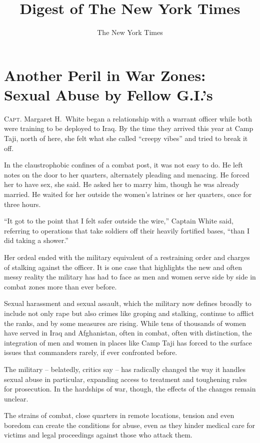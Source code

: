 ﻿\documentclass[12pt]{article}
\title{Digest of The New York Times}
\author{The New York Times}
\begin{document}
\date{}
\thispagestyle{empty}
\renewcommand\contentsname{\textsf{Digest of The New York Times}}
{\footnotesize\textsf{\tableofcontents}}
\clearpage
\setcounter{page}{1}

\section{Another Peril\cite{peril} in War Zones: Sexual Abuse by Fellow G.I.'s}

\lettrine{C}{apt}. Margaret H.~White began a relationship with a warrant
officer while both were training to be deployed to Iraq. By the time they arrived this year at Camp
Taji, north of here, she felt what she called ``creepy vibes'' and tried to break it off.

In the claustrophobic confines of a combat post, it was not easy to do. He left notes on the door to
her quarters, alternately pleading and menacing. He forced her to have sex, she said. He asked her
to marry him, though he was already married. He waited for her outside the women's latrines or her
quarters, once for three hours.

``It got to the point that I felt safer outside the wire,'' Captain White said, referring to
operations that take soldiers off their heavily fortified bases, ``than I did taking a shower.''

Her ordeal ended with the military equivalent of a restraining order and charges of stalking against
the officer. It is one case that highlights the new and often messy reality the military has had to
face as men and women serve side by side in combat zones more than ever before.

Sexual harassment and sexual assault, which the military now defines broadly to include not only
rape but also crimes like groping and stalking, continue to afflict the ranks, and by some measures
are rising. While tens of thousands of women have served in Iraq and Afghanistan, often in combat,
often with distinction, the integration of men and women in places like Camp Taji has forced to the
surface issues that commanders rarely, if ever confronted before.

The military -- belatedly, critics say -- has radically changed the way it handles sexual abuse in
particular, expanding access to treatment and toughening rules for prosecution. In the hardships of
war, though, the effects of the changes remain unclear.

The strains of combat, close quarters in remote locations, tension and even boredom can create the
conditions for abuse, even as they hinder medical care for victims and legal proceedings against
those who attack them.
\end{document}
